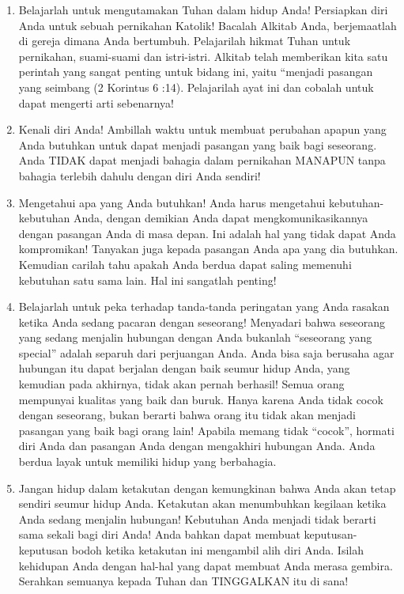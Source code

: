 \documentclass[11pt]{scrartcl}
\begin{document}
\begin{enumerate}
\item Belajarlah untuk mengutamakan Tuhan dalam hidup Anda! Persiapkan diri Anda untuk sebuah pernikahan Katolik! Bacalah Alkitab Anda, berjemaatlah di gereja dimana Anda bertumbuh. Pelajarilah hikmat Tuhan untuk pernikahan, suami-suami dan istri-istri. Alkitab telah memberikan kita satu perintah yang sangat penting untuk bidang ini, yaitu “menjadi pasangan yang seimbang (2 Korintus 6 :14). Pelajarilah ayat ini dan cobalah untuk dapat mengerti arti sebenarnya!

\item  Kenali diri Anda! Ambillah waktu untuk membuat perubahan apapun yang Anda butuhkan untuk dapat menjadi pasangan yang baik bagi seseorang. Anda TIDAK dapat menjadi bahagia dalam pernikahan MANAPUN tanpa bahagia terlebih dahulu dengan diri Anda sendiri!

\item  Mengetahui apa yang Anda butuhkan! Anda harus mengetahui kebutuhan-kebutuhan Anda, dengan demikian Anda dapat mengkomunikasikannya dengan pasangan Anda di masa depan. Ini adalah hal
yang tidak dapat Anda kompromikan! Tanyakan juga kepada pasangan Anda apa yang dia butuhkan. Kemudian carilah tahu apakah Anda berdua dapat saling memenuhi kebutuhan satu sama lain. Hal ini sangatlah penting!

\item  Belajarlah untuk peka terhadap tanda-tanda peringatan yang Anda rasakan ketika Anda sedang pacaran dengan seseorang! Menyadari bahwa seseorang yang sedang menjalin hubungan dengan Anda bukanlah “seseorang yang special” adalah separuh dari perjuangan Anda. Anda bisa saja berusaha agar hubungan itu dapat berjalan dengan baik seumur hidup Anda, yang kemudian pada akhirnya, tidak akan pernah berhasil! Semua orang mempunyai kualitas yang baik dan buruk. Hanya karena Anda tidak cocok
dengan seseorang, bukan berarti bahwa orang itu tidak akan menjadi pasangan yang baik bagi orang lain! Apabila memang tidak “cocok”, hormati diri Anda dan pasangan Anda dengan mengakhiri hubungan Anda. Anda berdua layak untuk memiliki hidup yang berbahagia.

\item  Jangan hidup dalam ketakutan dengan kemungkinan bahwa Anda akan tetap sendiri seumur hidup Anda. Ketakutan akan menumbuhkan kegilaan ketika Anda sedang menjalin hubungan! Kebutuhan Anda menjadi tidak berarti sama sekali bagi diri Anda! Anda bahkan dapat membuat keputusan-keputusan bodoh ketika ketakutan ini mengambil alih diri Anda. Isilah kehidupan Anda dengan hal-hal yang dapat membuat Anda merasa gembira. Serahkan semuanya kepada Tuhan dan TINGGALKAN itu di sana!


\end{enumerate}
\end{document}

